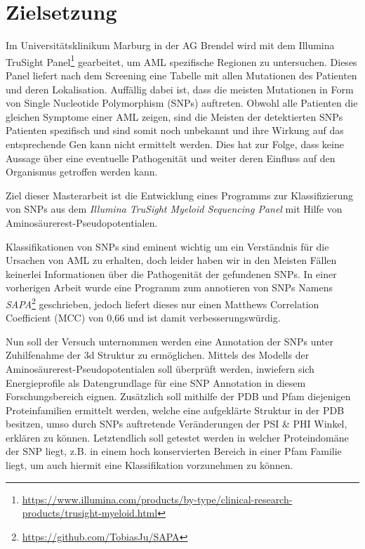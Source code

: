 \section{Zielsetzung}

Im Universitätsklinikum Marburg in der AG Brendel wird mit dem Illumina TruSight Panel\footnote{\url{https://www.illumina.com/products/by-type/clinical-research-products/trusight-myeloid.html}} gearbeitet, um AML spezifische Regionen zu untersuchen. Dieses Panel liefert nach dem Screening eine Tabelle mit allen Mutationen des Patienten und deren Lokalisation. Auffällig dabei ist, dass die meisten Mutationen in Form von Single Nucleotide Polymorphism (SNPs) auftreten. Obwohl alle Patienten die gleichen Symptome einer AML zeigen, sind die Meisten der detektierten SNPs Patienten spezifisch und sind somit noch unbekannt und ihre Wirkung auf das entsprechende Gen kann nicht ermittelt werden. Dies hat zur Folge, dass keine Aussage über eine eventuelle Pathogenität und weiter deren Einfluss auf den Organismus getroffen werden kann.

Ziel dieser Masterarbeit ist die Entwicklung eines Programms zur Klassifizierung von SNPs aus dem \emph{Illumina TruSight Myeloid Sequencing Panel} mit Hilfe von Aminosäurerest-Pseudopotentialen.

Klassifikationen von SNPs sind eminent wichtig um ein Verständnis für die Ursachen von AML zu erhalten, doch leider haben wir in den Meisten Fällen keinerlei Informationen über die Pathogenität der gefundenen SNPs. In einer vorherigen Arbeit wurde eine Programm zum annotieren von SNPs Namens \emph{SAPA}\footnote{\url{https://github.com/TobiasJu/SAPA}} geschrieben, jedoch liefert dieses nur einen Matthews Correlation Coefficient (MCC) von 0,66 und ist damit verbesserungswürdig. 

Nun soll der Versuch unternommen werden eine Annotation der SNPs unter Zuhilfenahme der 3d Struktur zu ermöglichen. Mittels des Modells der Aminosäurerest-Pseudopotentialen soll überprüft werden, inwiefern sich Energieprofile als Datengrundlage für eine SNP Annotation in diesem Forschungsbereich eignen. Zusätzlich soll mithilfe der PDB und Pfam diejenigen Proteinfamilien ermittelt werden, welche eine aufgeklärte Struktur in der PDB besitzen, umso durch SNPs auftretende Veränderungen der PSI \& PHI Winkel, erklären zu können. Letztendlich soll getestet werden in welcher Proteindomäne der SNP liegt, z.B. in einem hoch konservierten Bereich in einer Pfam Familie liegt, um auch hiermit eine Klassifikation vorzunehmen zu können.



